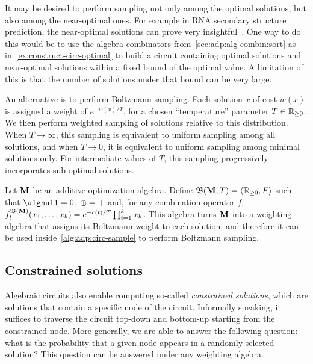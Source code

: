 \begin{example}\label{ex:adp:space-enum-sample:boltz}
    It may be desired to perform sampling not only among the optimal solutions, but also among the near-optimal ones.
    For example in RNA secondary structure prediction, the near-optimal solutions can prove very insightful~\parencite{McCaskill1990EquilibriumPartitionFunction}.
    One way to do this would be to use the algebra combinators from~\cref{sec:adp:alg-combin:sort} as in~\cref{ex:construct-circ-optimal} to build a circuit containing optimal solutions and near-optimal solutions within a fixed bound of the optimal value.
    A limitation of this is that the number of solutions under that bound can be very large.

    An alternative is to perform Boltzmann sampling.
    Each solution \(x\) of cost \(w(x)\) is assigned a weight of \(e^{-w(x)/T}\), for a chosen \enquote{temperature} parameter \(T \in \mathbb{R}_{\ge 0}\).
    We then perform weighted sampling of solutions relative to this distribution.
    When \(T \rightarrow \infty\), this sampling is equivalent to uniform sampling among all solutions, and when \(T \rightarrow 0\), it is equivalent to uniform sampling among minimal solutions only.
    For intermediate values of \(T\), this sampling progressively incorporates sub-optimal solutions.

    Let \(\mathbf{M}\) be an additive optimization algebra. Define \(\mathfrak{B}(\mathbf{M}, T) = \left\langle\mathbb{R}_{\ge 0}, F\right\rangle\) such that
    \(\algnull = 0\),
    \(\mathbin{\oplus} = +\)
    and, for any combination operator \(f\),
    \(f^{\mathfrak{B}(\mathbf{M})}_t(x_1, \ldots, x_k) = e^{-c(t)/T} \prod_{i=1}^k{x_k}\).
    This algebra turns \(\mathbf{M}\) into a weighting algebra that assigns its Boltzmann weight to each solution, and therefore it can be used inside~\cref{alg:adp:circ-sample} to perform Boltzmann sampling.
\end{example}

\subsection{Constrained solutions}\label{sec:adp:space-enum-sample:outside}

Algebraic circuits also enable computing so-called \emph{constrained solutions}, which are solutions that contain a specific node of the circuit.
Informally speaking, it suffices to traverse the circuit top-down and bottom-up starting from the constrained node.
More generally, we are able to answer the following question: what is the probability that a given node appears in a randomly selected solution?
This question can be answered under any weighting algebra.

